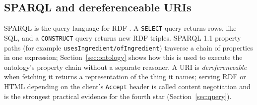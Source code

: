 \subsection{SPARQL and dereferenceable URIs}

SPARQL is the query language for RDF \cite{sparql11}. A \texttt{SELECT} query
returns rows, like SQL, and a \texttt{CONSTRUCT} query returns new RDF triples.
SPARQL 1.1 property paths (for example
\texttt{usesIngredient/ofIngredient}) traverse a chain of
properties in one expression; Section~\ref{sec:ontology} shows how this is used to execute the
ontology's property chain without a separate reasoner. A URI is
\emph{dereferenceable} when fetching it returns a representation of the thing
it names; serving RDF or HTML depending on the client's \texttt{Accept} header
is called content negotiation and is the strongest practical evidence for the
fourth star (Section~\ref{sec:query}).


